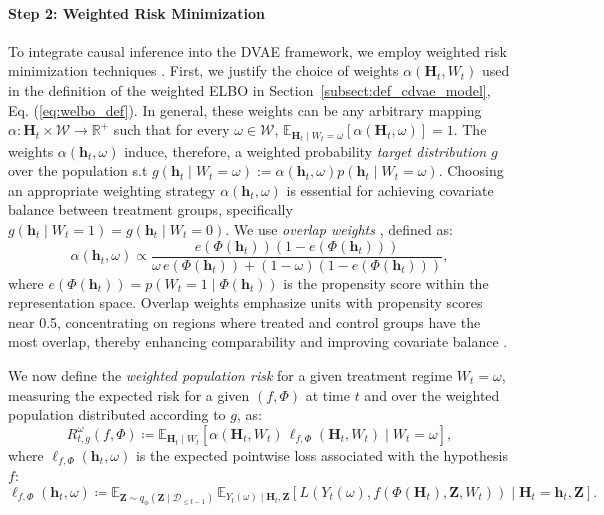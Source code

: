 \documentclass[10pt]{article} %
\begin{document}
\paragraph{Step 2: Weighted Risk Minimization} To integrate causal inference into the DVAE framework, we employ weighted risk minimization techniques \citep{kallus2020deepmatch, johansson2022generalization}. First, we justify the choice of weights $\alpha(\mathbf{H}_t, W_t)$ used in the definition of the weighted ELBO in Section~\ref{subsect:def_cdvae_model}, Eq. (\ref{eq:welbo_def}). In general, these weights can be any arbitrary mapping $\alpha: \mathbf{H}_t \times \mathcal{W} \rightarrow \mathbb{R}^+$ such that for every \(\omega \in \mathcal{W}\), \(\mathbb{E}_{\mathbf{H}_t \mid W_t = \omega} \left[ \alpha(\mathbf{H}_t, \omega) \right] = 1\). The weights $\alpha(\mathbf{h}_t, \omega)$ induce, therefore, a weighted probability \emph{target distribution} $g$ over the population s.t $g(\mathbf{h}_t\mid W_t = \omega):= \alpha(\mathbf{h}_t, \omega)p(\mathbf{h}_t \mid W_t = \omega)$. Choosing an appropriate weighting strategy \(\alpha(\mathbf{h}_t, \omega)\) is essential for achieving covariate balance between treatment groups, specifically \(g(\mathbf{h}_t \mid W_t = 1) = g(\mathbf{h}_t \mid W_t = 0)\). We use \emph{overlap weights} \citep{li2018balancing, assaad2021counterfactual}, defined as:
\[
    \alpha(\mathbf{h}_t, \omega) \propto \frac{e(\Phi(\mathbf{h}_t)) \left( 1 - e(\Phi(\mathbf{h}_t)) \right)}{\omega \, e(\Phi(\mathbf{h}_t)) + (1 - \omega) \left( 1 - e(\Phi(\mathbf{h}_t)) \right)},
    \label{eq:weights_fam}
\]
where \(e(\Phi(\mathbf{h}_t)) = p(W_t = 1 \mid \Phi(\mathbf{h}_t))\) is the propensity score within the representation space. Overlap weights emphasize units with propensity scores near 0.5, concentrating on regions where treated and control groups have the most overlap, thereby enhancing comparability and improving covariate balance \citep{li2018balancing}. %

We now define the \emph{weighted population risk} for a given treatment regime \( W_t = \omega \), measuring the expected risk for a given \( (f, \Phi) \) at time \( t \) and over the weighted population distributed according to \( g \), as:
\[    
R_{t, g}^{\omega}(f, \Phi) \coloneqq \mathbb{E}_{\mathbf{H}_t \mid W_t} \left[ \alpha(\mathbf{H}_t, W_t) \, \ell_{f, \Phi}(\mathbf{H}_t, W_t) \mid W_t = \omega \right],
\]
where \( \ell_{f, \Phi}(\mathbf{h}_t, \omega) \) is the expected pointwise loss associated with the hypothesis \( f \):
\begin{equation}
\label{eq:expected_pt_loss}
\ell_{f, \Phi}(\mathbf{h}_t, \omega) \coloneqq \mathbb{E}_{\mathbf{Z} \sim q_{\phi}(\mathbf{Z} \mid \mathcal{D}_{\leq t-1})} \, \mathbb{E}_{Y_t(\omega) \mid \mathbf{H}_t, \mathbf{Z}} \left[ L\left( Y_t(\omega), f\left( \Phi(\mathbf{H}_t), \mathbf{Z}, W_t \right) \right) \mid  \mathbf{H}_t=\mathbf{h}_t, \mathbf{Z} \right].
\end{equation}
\end{document}

